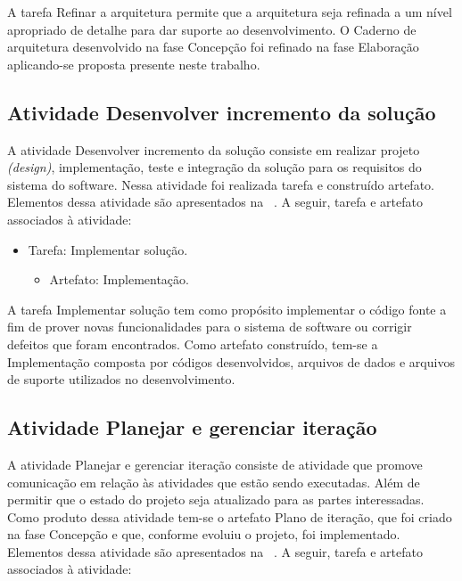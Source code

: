 A tarefa Refinar a arquitetura permite que a arquitetura seja refinada a um nível apropriado de detalhe para dar suporte ao desenvolvimento. O Caderno de arquitetura desenvolvido na fase Concepção foi refinado na fase Elaboração aplicando-se proposta presente neste trabalho.

\subsection{Atividade Desenvolver incremento da solução}

%

A atividade Desenvolver incremento da solução consiste em realizar projeto \emph{(design)}, implementação, teste e integração da solução para os requisitos do sistema do software.  Nessa atividade foi realizada tarefa e construído artefato. Elementos dessa atividade são apresentados na ~. A seguir, tarefa e artefato associados à atividade:

\begin{itemize}
    \item Tarefa: Implementar solução.
    \begin{itemize}
        \item Artefato: Implementação.
    \end{itemize}
\end{itemize}

A tarefa Implementar solução tem como propósito implementar o código fonte a fim de prover novas funcionalidades para o sistema de software ou corrigir defeitos que foram encontrados. Como artefato construído, tem-se a Implementação composta por códigos desenvolvidos, arquivos de dados e arquivos de suporte utilizados no desenvolvimento.

\subsection{Atividade Planejar e gerenciar iteração}


A atividade Planejar e gerenciar iteração consiste de atividade que promove comunicação em relação às atividades que estão sendo executadas. Além de permitir que o estado do projeto seja atualizado para as partes interessadas. Como produto dessa atividade tem-se o artefato Plano de iteração, que foi criado na fase Concepção e que, conforme evoluiu o projeto, foi implementado. 
Elementos dessa atividade são apresentados na ~. A seguir, tarefa e artefato associados à atividade:


